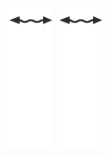 \begin{figure}[h!]
   	\includegraphics[width=1.2cm]{itrenzas/flechac.png}
   	\includegraphics[width=1.2cm]{itrenzas/flechac.png}

\end{figure}
